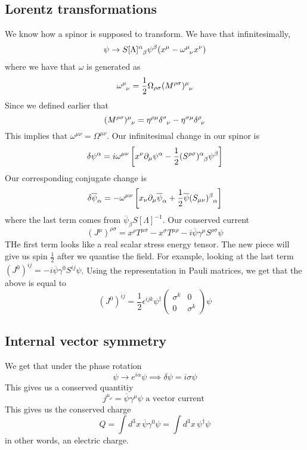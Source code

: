 \subsection{Lorentz transformations} 
We know how a spinor is supposed to transform. 
We have that infinitesimally, 
\[
	\psi \to S [ \Lambda ] \indices{ ^ \alpha _ \beta }  \psi ^ \beta  ( x ^ \mu - \omega  \indices{ ^ \mu _ \nu} x ^ \nu )  
\] where we have that $ \omega  $ is generated as 
\[
\omega \indices{ ^ \mu _ \nu } =  \frac{1}{2 } \Omega_{ \rho \sigma } ( M ^{ \rho \sigma } )\indices{ ^ \mu _ \nu }  
\] Since we defined earlier that 
\[
( M ^{ \rho \sigma } ) \indices{ ^ \mu _ \nu } = \eta ^{ \rho \mu } \delta \indices{ ^ \sigma _ \nu }
 - \eta ^{ \sigma \mu } \delta \indices{ ^ \rho _ \nu } 
\] This implies that $ \omega ^{ \mu \nu } = \Omega ^{ \mu \nu } $. 
Our infinitesimal change in our spinor is 
\[
\delta \psi ^ \alpha    = i \omega ^{ \mu \nu }  \left[ 
x ^ \nu \partial  _ \mu \psi ^ \alpha  - \frac{1}{2 }  ( S ^{ \rho \sigma } ) \indices{ ^ \alpha 
_ \beta } \psi ^ \beta  \right] 
\] Our corresponding conjugate change is 
\[
\delta \overline{ \psi } _ \alpha  = 
- \omega ^{ \mu \nu } \left[  x _ \nu \partial  _ \mu \overline{\psi }_ \alpha 
+ \frac{1}{2 } \overline{\psi } ( S_{ \mu \nu } ) \indices{ ^ \beta _ \alpha }  \right]  
\] where the last term comes from $ \overline{\psi }_ \beta  S [ \Lambda ] ^{ - 1} $. 
Our conserved current 
\[
( J ^ \mu ) ^{ \rho \sigma }  = x ^ \rho T ^{ \mu \sigma } - x ^ \sigma T ^{ \mu \rho }  - i 
\overline{ \psi } \gamma ^ \mu S ^{ \rho \sigma } \psi 
\] THe first term looks like a real scalar stress energy tensor. 
The new piece will give us spin $ \frac{1}{2 } $ after we quantise the
field. 
For example, looking at the last term $ ( J ^ 0 ) ^{ ij }  =  -i \overline{ \psi } \gamma ^ 0 S ^{ ij } \psi$. 
Using the representation in Pauli matrices, 
we get that the above is equal to 
\[
( J ^ 0 ) ^{ ij }  = \frac{1}{2 } \epsilon ^{ ijk  } \psi ^ \dagger 
\begin{pmatrix}  \sigma ^ k & 0 \\ 0 & \sigma ^ k  \end{pmatrix} \psi  
\] 
\subsection{Internal vector symmetry} 
We get that under the phase rotation 
\[
\psi \to e^{ i \alpha } \psi \implies \delta \psi  = i \sigma \psi 
\] This gives us a conserved quantitiy 
\[
j ^{ \mu _ \nu }  = \overline{ \psi } \gamma ^ \mu \psi \text{ a vector current }
\] This gives us the conserved charge 
\[
Q = \int d^ 3 x \, \overline{\psi } \gamma^ 0 \psi  = \int d ^ 3 x \, \psi ^ \dagger \psi 
\]  in other words, an electric charge. 


